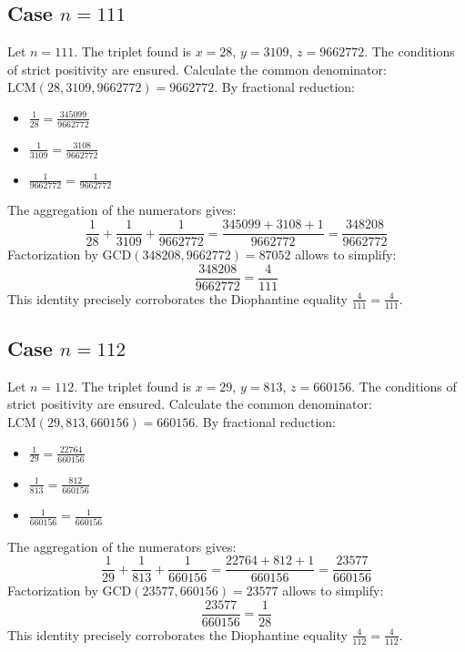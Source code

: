 \documentclass[11pt,a4paper]{article}
\begin{document}
\subsection{Case $n = 111$}
Let $n = 111$. The triplet found is $x = 28$, $y = 3109$, $z = 9662772$.
The conditions of strict positivity are ensured.
Calculate the common denominator: $\text{LCM}(28, 3109, 9662772) = 9662772$.
By fractional reduction:
\begin{itemize}
    \item $\frac{1}{28} = \frac{345099}{9662772}$
    \item $\frac{1}{3109} = \frac{3108}{9662772}$
    \item $\frac{1}{9662772} = \frac{1}{9662772}$
\end{itemize}
The aggregation of the numerators gives:
$$ \frac{1}{28} + \frac{1}{3109} + \frac{1}{9662772} = \frac{345099 + 3108 + 1}{9662772} = \frac{348208}{9662772} $$
Factorization by $\text{GCD}(348208, 9662772) = 87052$ allows to simplify:
$$ \frac{348208}{9662772} = \frac{4}{111} $$
This identity precisely corroborates the Diophantine equality $\frac{4}{111} = \frac{4}{111}$.

\subsection{Case $n = 112$}
Let $n = 112$. The triplet found is $x = 29$, $y = 813$, $z = 660156$.
The conditions of strict positivity are ensured.
Calculate the common denominator: $\text{LCM}(29, 813, 660156) = 660156$.
By fractional reduction:
\begin{itemize}
    \item $\frac{1}{29} = \frac{22764}{660156}$
    \item $\frac{1}{813} = \frac{812}{660156}$
    \item $\frac{1}{660156} = \frac{1}{660156}$
\end{itemize}
The aggregation of the numerators gives:
$$ \frac{1}{29} + \frac{1}{813} + \frac{1}{660156} = \frac{22764 + 812 + 1}{660156} = \frac{23577}{660156} $$
Factorization by $\text{GCD}(23577, 660156) = 23577$ allows to simplify:
$$ \frac{23577}{660156} = \frac{1}{28} $$
This identity precisely corroborates the Diophantine equality $\frac{4}{112} = \frac{4}{112}$.
\end{document}
